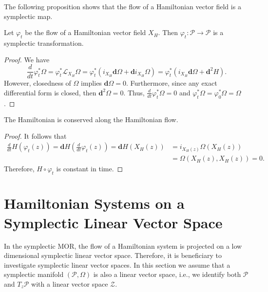 The following proposition shows that the flow of a Hamiltonian vector field is a symplectic map.
\begin{proposition} \label{theorem:2.9}
Let $\varphi_t$ be the flow of a Hamiltonian vector field $X_H$. Then $\varphi_t:\mathcal P \to \mathcal P$ is a symplectic transformation.
\end{proposition}
\begin{proof}
We have
\begin{equation*}
	\frac{d}{dt} \varphi_t^* \Omega = \varphi_t^* \mathcal L_{X_H} \Omega = \varphi_t^*( i_{X_H} \mathbf d \Omega + \mathbf d i_{X_H} \Omega ) =  \varphi_t^*( i_{X_H} \mathbf d \Omega + \mathbf d^2 H ).
\end{equation*}
However, closedness of $\Omega$ implies $\mathbf d \Omega = 0$. Furthermore, since any exact differential form is closed, then $\mathbf d^2 \Omega = 0$. Thus, $\frac{d}{dt} \varphi_t^* \Omega = 0$ and $\varphi_t^* \Omega = \varphi_0^* \Omega = \Omega$.
\end{proof}
\begin{corollary} \label{theorem:2.10}
The Hamiltonian is conserved along the Hamiltonian flow.
\end{corollary}
\begin{proof}
It follows that
\begin{equation*}
\begin{aligned}
	\frac{d}{dt} H(\varphi_t(z)) = \mathbf dH\left( \frac{d}{dt} \varphi_t(z) \right) = \mathbf dH \left( X_H(z) \right) &= i_{X_H(z)} \Omega(X_H(z))\\
	& = \Omega(X_H(z),X_H(z)) = 0.
\end{aligned}
\end{equation*}
Therefore, $H\circ \varphi_t$ is constant in time.
\end{proof}

\section{Hamiltonian Systems on a Symplectic Linear Vector Space} \label{section:2.4}
In the symplectic MOR, the flow of a Hamiltonian system is projected on a low dimensional symplectic linear vector space. Therefore, it is beneficiary to investigate symplectic linear vector spaces. In this section we assume that a symplectic manifold $(\mathcal P, \Omega)$ is also a linear vector space, i.e., we identify both $\mathcal P$ and $T_z \mathcal P$ with a linear vector space $\mathcal Z$.


